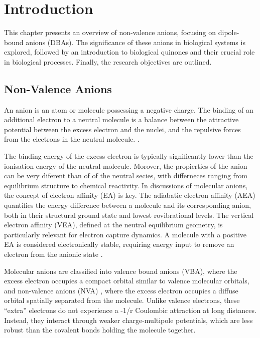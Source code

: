 \chapter{Introduction}\label{ch:introduction}
This chapter presents an overview of non-valence anions, focusing on dipole-bound anions (DBAs). The significance of these anions in biological systems is explored, followed by an introduction to biological quinones and their crucial role in biological processes. Finally, the research objectives are outlined.

\section{Non-Valence Anions}
An anion is an atom or molecule possessing a negative charge. The binding of an additional electron to a neutral molecule is a balance between the attractive potential between the excess electron and the nuclei, and the repulsive forces from the electrons in the neutral molecule.  \cite{simons2008molecular,simons2023molecular,simons2011theoretical,herbert2015quantum}.

The binding energy of the excess electron is typically significantly lower than the ionisation energy of the neutral molecule. Morover, the propierties of the anion can be very diferent than of of the neutral secies, with differneces ranging from equilibrium structure to chemical reactivity. In discussions of molecular anions, the concept of electron affinity (EA) is key. The adiabatic electron affinity (AEA) quantifies the energy difference between a molecule and its corresponding anion, both in their structural ground state and lowest rovibrational levels. The vertical electron affinity (VEA), defined at the neutral equilibrium geometry, is particularly relevant for electron capture dynamics. A molecule with a positive EA is considered electronically stable, requiring energy input to remove an electron from the anionic state \cite{simons2008molecular}.

Molecular anions are classified into valence bound anions (VBA), where the excess electron occupies a compact orbital similar to valence molecular orbitals, and non-valence anions (NVA) , where the excess electron occupies a diffuse orbital spatially separated from the molecule. Unlike valence electrons, these ``extra'' electrons do not experience a -1/r Coulombic attraction at long distances. Instead, they interact through weaker charge-multipole potentials, which are less robust than the covalent bonds holding the molecule together\cite{simons2008molecular,herbert2015quantum}.


